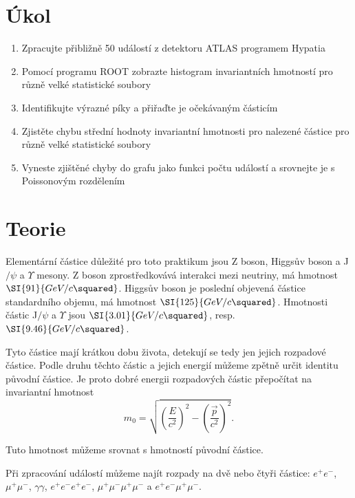 \documentclass{protokol}
\begin{document}
  \section*{Úkol}

    \begin{enumerate}
      \item Zpracujte přibližně 50 událostí z detektoru ATLAS programem Hypatia
      \item Pomocí programu ROOT zobrazte histogram invariantních hmotností pro různě velké statistické soubory
      \item Identifikujte výrazné píky a přiřaďte je očekávaným částicím
      \item Zjistěte chybu střední hodnoty invariantní hmotnosti pro nalezené částice pro různě velké statistické soubory
      \item Vyneste zjištěné chyby do grafu jako funkci počtu událostí a srovnejte je s Poissonovým rozdělením 
    \end{enumerate}

  \section*{Teorie}

    Elementární částice důležité pro toto praktikum jsou Z boson, Higgsův boson a J$/\psi$ a $\Upsilon$ mesony. Z boson zprostředkovává interakci mezi neutriny, má hmotnost $\SI{91}{GeV/c\squared}$. Higgsův boson je poslední objevená částice standardního objemu, má hmotnost $\SI{125}{GeV/c\squared}$. Hmotnosti částic J$/\psi$ a $\Upsilon$ jsou $\SI{3.01}{GeV/c\squared}$, resp. $\SI{9.46}{GeV/c\squared}$.

    Tyto částice mají krátkou dobu života, detekují se tedy jen jejich rozpadové částice. Podle druhu těchto částic a jejich energií můžeme zpětně určit identitu původní částice. Je proto dobré energii rozpadových částic přepočítat na invariantní hmotnost
    \begin{equation}
      m_0 = \sqrt{ \left( \frac{ E }{ c^2 } \right)^2 - \left( \frac{ \vec{p} }{ c^2 } \right)^2 }.
    \end{equation}
    
    Tuto hmotnost můžeme srovnat s hmotností původní částice.

    Při zpracování událostí můžeme najít rozpady na dvě nebo čtyři částice: $e^+ e^-$, $\mu^+ \mu^-$, $\gamma \gamma$, $e^+ e^- e^+ e^-$, $\mu^+ \mu^- \mu^+ \mu^-$ a $ e^+ e^- \mu^+ \mu^-$.
\end{document}
